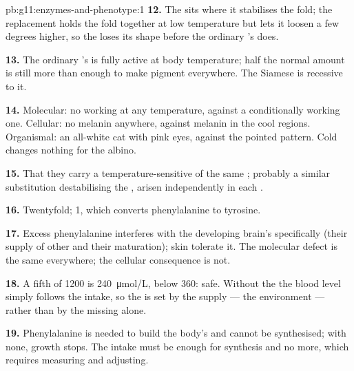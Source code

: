 \begin{solution}{pb:g11:enzymes-and-phenotype:1}
\textbf{12.} The  sits where it stabilises the fold; the
replacement holds the fold together at low temperature but lets it
loosen a few degrees higher, so the  loses its shape
before the ordinary 's does.

\textbf{13.} The ordinary 's  is fully active at body
temperature; half the normal amount is still more than enough to make
pigment everywhere. The Siamese  is recessive to it.

\textbf{14.} Molecular: no working  at any temperature, against
a conditionally working one. Cellular: no melanin anywhere, against
melanin in the cool regions. Organismal: an all-white cat with pink
eyes, against the pointed pattern. Cold changes nothing for the
albino.

\textbf{15.} That they carry a temperature-sensitive  of the
same ; probably a similar substitution destabilising the ,
arisen independently in each .

\textbf{16.} Twentyfold;  1, which converts phenylalanine to
tyrosine.

\textbf{17.} Excess phenylalanine interferes with the developing
brain's  specifically (their supply of other  and
their maturation); skin  tolerate it. The molecular defect is the
same everywhere; the cellular consequence is not.

\textbf{18.} A fifth of \num{1200} is \qty{240}{\micro mol/L}, below
\num{360}: safe. Without the  the blood level simply follows
the intake, so the  is set by the  supply --- the
environment --- rather than by the missing  alone.

\textbf{19.} Phenylalanine is needed to build the body's  and
cannot be synthesised; with none, growth stops. The intake must be
enough for  synthesis and no more, which requires measuring
and adjusting.


\end{solution}
